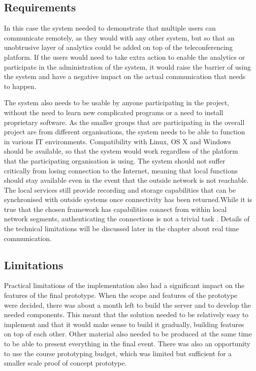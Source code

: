 \documentclass[english,12pt,a4paper,pdftex]{article}
\begin{document}
\subsection{Requirements}

In this case the system needed to demonstrate that multiple users can communicate remotely, as they would with any other system, but so that an unobtrusive layer of analytics could be added on top of the teleconferencing platform. If the users would need to take extra action to enable the analytics or participate in the administration of the system, it would raise the barrier of using the system and have a negative impact on the actual communication that needs to happen. 

The system also needs to be usable by anyone participating in the project, without the need to learn new complicated programs or a need to install proprietary software. As the smaller groups that are participating in the overall project are from different organisations, the system needs to be able to function in various IT environments. Compatibility with Linux, OS X and Windows should be available, so that the system would work regardless of the platform that the participating organisation is using. The system should not suffer critically from losing connection to the Internet, meaning that local functions should stay available even in the event that the outside network is not reachable. The local services still provide recording and storage capabilities that can be synchronised with outside systems once connectivity has been returned.While it is true that the chosen framework has capabilities connect from within local network segments, authenticating the connections is not a trivial task \cite{Johnston}. Details of the technical limitations will be discussed later in the chapter about real time communication.


\subsection{Limitations}

Practical limitations of the implementation also had a significant impact on the features of the final prototype. When the scope and features of the prototype were decided, there was about a month left to build the server and to develop the needed components. This meant that the solution needed to be relatively easy to implement and that it would make sense to build it gradually, building features on top of each other. Other material also needed to be produced at the same time to be able to present everything in the final event. There was also an opportunity to use the course prototyping budget, which was limited but sufficient for a smaller scale proof of concept prototype.
\end{document}
